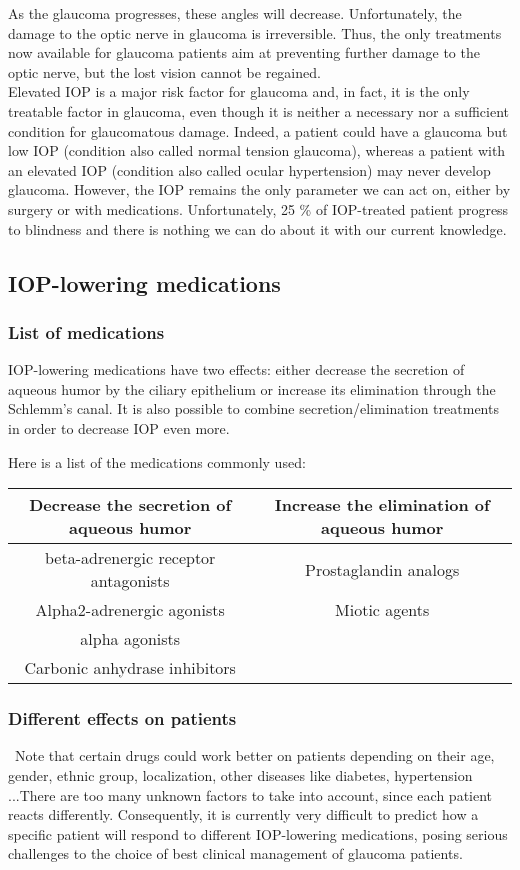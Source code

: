 \documentclass[english,12pt]{article}
\begin{document}
As the glaucoma progresses, these angles will decrease. Unfortunately, the damage to the optic nerve in glaucoma is irreversible. Thus, the only treatments now available for glaucoma patients aim at preventing further damage to the optic nerve, but the lost vision cannot be regained.\\
%
\indent Elevated IOP is a major risk factor for glaucoma and, in fact, it is the only treatable factor in glaucoma, even though it is neither a necessary nor a sufficient condition for glaucomatous damage. Indeed, a patient could have a glaucoma but low IOP (condition also called normal tension glaucoma), whereas a patient with an elevated IOP (condition also called ocular hypertension) may never develop glaucoma. However, the IOP remains the only parameter we can act on, either by surgery or with medications. 
Unfortunately, 25 \% of IOP-treated patient progress to blindness and there is nothing we can do about it with our current knowledge.
\subsection{IOP-lowering medications}
\subsubsection{List of medications}
IOP-lowering medications have two effects: either decrease the secretion of aqueous humor by the ciliary epithelium or increase its elimination through the Schlemm's canal. It is also possible to combine secretion/elimination treatments in order to decrease IOP even more.

Here is a list of the medications commonly used:\\
\begin{tabular}{|c|c|}
\hline
Decrease the secretion of aqueous humor & Increase the elimination of aqueous humor\\
\hline
beta-adrenergic receptor antagonists & Prostaglandin analogs \\
Alpha2-adrenergic agonists & Miotic agents \\
alpha agonists &  \\
Carbonic anhydrase inhibitors &  \\
\hline
\end{tabular}
\subsubsection{Different effects on patients}\
\indent Note that certain drugs could work better on patients depending on their age, gender, ethnic group, localization, other diseases like diabetes, hypertension ...There are too many unknown factors to take into account, since each patient reacts differently. 
Consequently, it is currently very difficult to predict how a specific patient will respond to different IOP-lowering medications, posing serious challenges to the choice of best clinical management of glaucoma patients.\\
\end{document}
